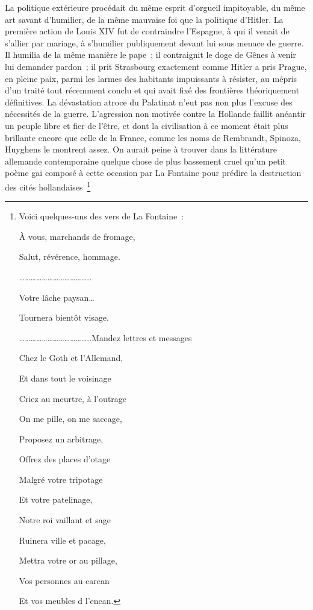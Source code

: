 \documentclass[french,twoside]{book} %
\begin{document}
La politique extérieure procédait du même esprit d'orgueil impitoyable, du même art savant d'humilier, de la même mauvaise foi que la politique d'Hitler. La première action de Louis XIV fut de contraindre l'Espagne, à qui il venait de s'allier par mariage, à s'humilier publiquement devant lui sous menace de guerre. Il humilia de la même manière le pape ; il contraignit le doge de Gênes à venir lui demander pardon ; il prit Strasbourg exactement comme Hitler a pris Prague, en pleine paix, parmi les larmes des habitants impuissants à résister, au mépris d'un traité tout récemment conclu et qui avait fixé des frontières théoriquement définitives. La dévastation atroce du Palatinat n'eut pas non plus l'excuse des nécessités de la guerre. L'agression non motivée contre la Hollande faillit anéantir un peuple libre et fier de l'être, et dont la civilisation à ce moment était plus brillante encore que celle de la France, comme les noms de Rembrandt, Spinoza, Huyghens le montrent assez. On aurait peine à trouver dans la littérature allemande contemporaine quelque chose de plus bassement cruel qu'un petit poème gai composé à cette occasion par La Fontaine pour prédire la destruction des cités hollandaises \footnote{\noindent Voici quelques-uns des vers de La Fontaine :\par
À vous, marchands de fromage,\par
Salut, révérence, hommage.\par
………………………………..\par
Votre lâche paysan…\par
Tournera bientôt visage.\par
………………………………..Mandez lettres et messages\par
Chez le Goth et l'Allemand,\par
Et dans tout le voisinage\par
Criez au meurtre, à l'outrage\par
On me pille, on me saccage,\par
Proposez un arbitrage,\par
Offrez des places d'otage\par
Malgré votre tripotage\par
Et votre patelinage,\par
Notre roi vaillant et sage\par
Ruinera ville et pacage,\par
Mettra votre or au pillage,\par
Vos personnes au carcan\par
Et vos meubles d l'encan.\par
}
\end{document}

